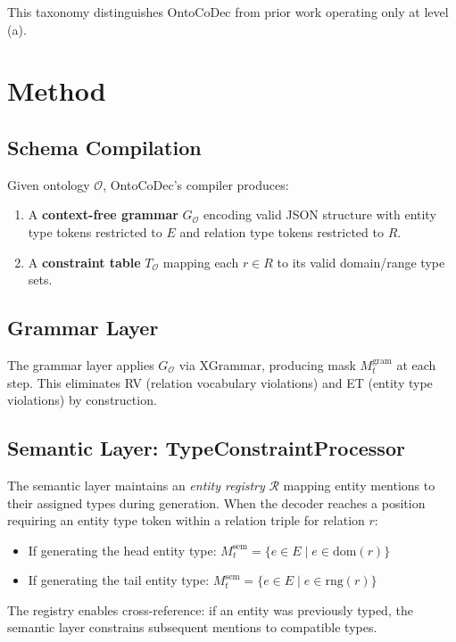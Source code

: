 \documentclass[11pt]{article}
\begin{document}
This taxonomy distinguishes OntoCoDec from prior work operating only at level (a).

\section{Method}

\subsection{Schema Compilation}

Given ontology $\mathcal{O}$, OntoCoDec's compiler produces:
\begin{enumerate}
\item A \textbf{context-free grammar} $G_\mathcal{O}$ encoding valid JSON structure with entity type tokens restricted to $E$ and relation type tokens restricted to $R$.
\item A \textbf{constraint table} $T_\mathcal{O}$ mapping each $r \in R$ to its valid domain/range type sets.
\end{enumerate}

\subsection{Grammar Layer}

The grammar layer applies $G_\mathcal{O}$ via XGrammar, producing mask $M^{\text{gram}}_t$ at each step. This eliminates RV (relation vocabulary violations) and ET (entity type violations) by construction.

\subsection{Semantic Layer: TypeConstraintProcessor}

The semantic layer maintains an \emph{entity registry} $\mathcal{R}$ mapping entity mentions to their assigned types during generation. When the decoder reaches a position requiring an entity type token within a relation triple for relation $r$:
\begin{itemize}
\item If generating the head entity type: $M^{\text{sem}}_t = \{e \in E \mid e \in \text{dom}(r)\}$
\item If generating the tail entity type: $M^{\text{sem}}_t = \{e \in E \mid e \in \text{rng}(r)\}$
\end{itemize}

The registry enables cross-reference: if an entity was previously typed, the semantic layer constrains subsequent mentions to compatible types.
\end{document}
